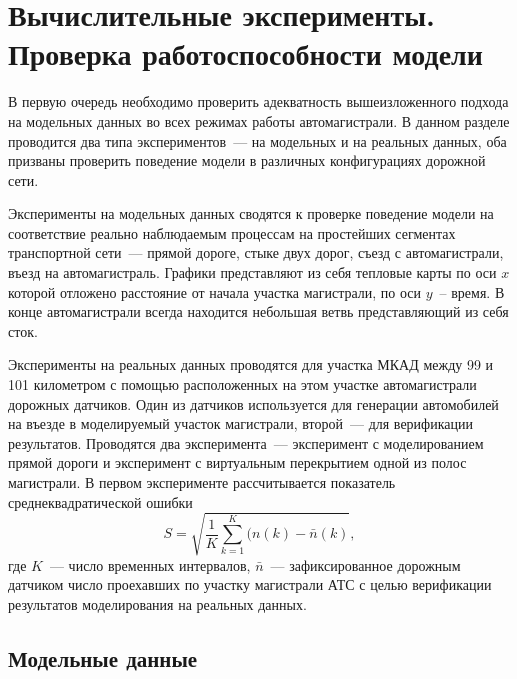 \chapter{Вычислительные эксперименты. Проверка работоспособности модели}\label{ch:ch4}

В первую очередь необходимо проверить адекватность вышеизложенного подхода на модельных данных во всех режимах работы автомагистрали.
В данном разделе проводится два типа экспериментов~--- на модельных и на реальных данных, оба призваны проверить поведение модели в различных конфигурациях дорожной сети.

Эксперименты на модельных данных сводятся к проверке поведение модели на соответствие реально наблюдаемым процессам на простейших сегментах транспортной сети~--- прямой дороге, стыке двух дорог, съезд с автомагистрали, въезд на автомагистраль.
Графики представляют из себя тепловые карты по оси $x$ которой отложено расстояние от начала участка магистрали, по оси $y$~-- время.
В конце автомагистрали всегда находится небольшая ветвь представляющий из себя сток.

Эксперименты на реальных данных проводятся для участка МКАД между 99 и 101 километром с помощью расположенных на этом участке автомагистрали дорожных датчиков.
Один из датчиков используется для генерации автомобилей на въезде в моделируемый участок магистрали, второй~--- для верификации результатов.
Проводятся два эксперимента~--- эксперимент с моделированием прямой дороги и эксперимент с виртуальным перекрытием одной из полос магистрали.
В первом эксперименте рассчитывается показатель среднеквадратической ошибки
\[
    S = \sqrt{\frac{1}{K}\sum_{k=1}^K (n(k) - \bar{n}(k)},
\]
где $K$~--- число временных интервалов, $\bar{n}$~--- зафиксированное дорожным датчиком число проехавших по участку магистрали АТС с целью верификации результатов моделирования на реальных данных.

\section{Модельные данные}
